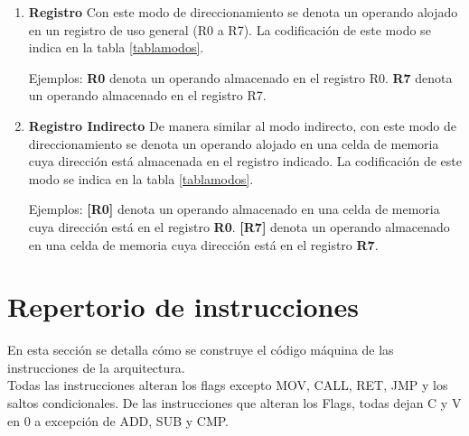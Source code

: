 \begin{enumerate}
\item \textbf{Registro} Con este modo de direccionamiento se denota un operando alojado en un registro de uso general (R0 a R7). La codificación de este modo se indica en la tabla \ref{tablamodos}.

Ejemplos:
\textbf{R0} denota un operando almacenado en el registro R0. 
\textbf{R7} denota un operando almacenado en el registro R7.

\item \textbf{Registro Indirecto} De manera similar al modo indirecto, con este modo de direccionamiento se denota un operando alojado en una celda de memoria cuya dirección está almacenada en el registro indicado. La codificación de este modo se indica en la tabla \ref{tablamodos}.


Ejemplos:
\textbf{[R0]} denota un operando almacenado en una celda de memoria cuya dirección está en el registro \textbf{R0}.
\textbf{[R7]} denota un operando almacenado en una celda de memoria cuya dirección está en el registro \textbf{R7}.

\end{enumerate}


\section{Repertorio de instrucciones}
En esta sección se detalla cómo se construye el código máquina de las instrucciones de la arquitectura.\\

Todas las instrucciones alteran los flags excepto MOV, CALL, RET, JMP y los saltos condicionales. De las instrucciones que alteran los Flags, todas dejan C y V en 0 a excepción de ADD, SUB y CMP.  \\



